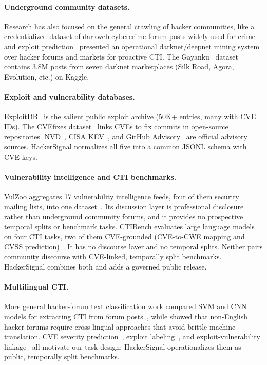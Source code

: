 \documentclass{article}
\begin{document}
\paragraph{Underground community datasets.} Research has also focused on the general crawling of hacker communities, like a credentialized dataset of darkweb cybercrime forum posts widely used for crime and exploit prediction~\citep{crimebb2018} \citet{nunes2016darknet} presented an operational darknet/deepnet mining system over hacker forums and markets for proactive CTI. The Gayanku~\citep{gayanku2020} dataset contains 3.8M posts from seven darknet marketplaces (Silk Road, Agora, Evolution, etc.) on Kaggle.

\paragraph{Exploit and vulnerability databases.} ExploitDB~\citep{exploitdb} is the salient public exploit archive (50K+ entries, many with CVE IDs). The CVEfixes dataset~\citep{cvefixes2021} links CVEs to fix commits in open-source repositories. NVD~\citep{nvd}, CISA KEV~\citep{cisakev}, and GitHub Advisory~\citep{githubadvisory} are official advisory sources. HackerSignal normalizes all five into a common JSONL schema with CVE keys.

\paragraph{Vulnerability intelligence and CTI benchmarks.} VulZoo aggregates 17 vulnerability intelligence feeds, four of them security mailing lists, into one dataset~\citep{vulzoo2024}. Its discussion layer is professional disclosure rather than underground community forums, and it provides no prospective temporal splits or benchmark tasks. CTIBench evaluates large language models on four CTI tasks, two of them CVE-grounded (CVE-to-CWE mapping and CVSS prediction)~\citep{ctibench2024}. It has no discourse layer and no temporal splits. Neither pairs community discourse with CVE-linked, temporally split benchmarks. HackerSignal combines both and adds a governed public release.

\paragraph{Multilingual CTI.} More general hacker-forum text classification work compared SVM and CNN models for extracting CTI from forum posts~\citep{deliu2017cti}, while \citet{ebrahimi2020crosslingual} showed that non-English hacker forums require cross-lingual approaches that avoid brittle machine translation. CVE severity prediction~\citep{severitypred2017}, exploit labeling~\citep{ampel2024misq}, and exploit-vulnerability linkage~\citep{samtani2022eva} all motivate our task design; HackerSignal operationalizes them as public, temporally split benchmarks.
\end{document}
